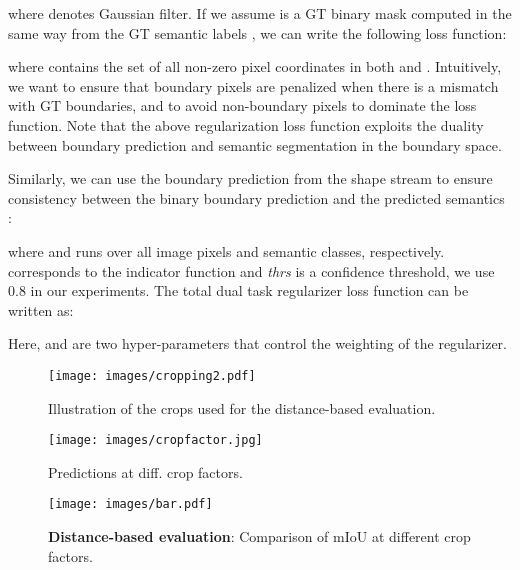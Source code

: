 \documentclass[10pt,twocolumn,letterpaper]{article}
\begin{document}
\vspace{-5mm}

where  denotes Gaussian filter. If we assume  is a GT binary mask computed in the same way from the GT semantic labels , we can write the following loss function:

\vspace{-3mm}
 
where  
contains the set of all non-zero pixel coordinates in both  and .
Intuitively, we want to ensure that boundary pixels are penalized when there is a mismatch with GT boundaries,
and to avoid non-boundary pixels to dominate the loss function. 
Note that the above regularization loss function exploits the duality between boundary prediction and semantic segmentation in the boundary space.

Similarly, we can use the boundary prediction from the shape stream  to ensure consistency between the binary boundary  prediction  and the predicted semantics :
\vspace{-3mm}
 
where  and  runs over all image pixels and semantic classes, respectively.   corresponds to the indicator function and \emph{thrs} is a confidence threshold, we use 0.8 in our experiments. The total dual task regularizer loss function can be written as:
 
Here,  and  are two hyper-parameters that control the weighting of the regularizer.

\begin{figure*}[t!]
\vspace{-0mm}
\centering
\begin{minipage}{0.3\linewidth}
\texttt{[image: images/cropping2.pdf]}
\vspace{-7mm}
\caption{\small Illustration of the crops used for the distance-based evaluation. 
}
\label{fig:cropping}
\end{minipage}
\hspace{0.2mm}
\begin{minipage}{0.3\linewidth}
\texttt{[image: images/cropfactor.jpg]}
\vspace{-7.5mm}
\caption{\small Predictions at diff. crop factors.  
}
\label{fig:crop}
\end{minipage}
\hspace{0.2mm}
\begin{minipage}{0.378\linewidth}
\texttt{[image: images/bar.pdf]}
\vspace{-6.5mm}
\caption{\small {\bf Distance-based evaluation}: Comparison of mIoU at different crop factors.
}
\label{fig:crops}
\end{minipage}
\vspace{-1mm}
\end{figure*}
\end{document}
